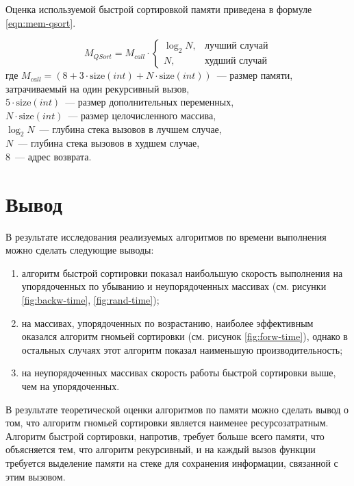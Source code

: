 Оценка используемой быстрой сортировкой памяти приведена в формуле \ref{eqn:mem-qsort}.

\begin{equation}
    \label{eqn:mem-qsort}
    M_{QSort} = M_{call} \cdot
    \begin{cases}
        \log_2{N}, & \text{лучший случай} \\
        N, & \text{худший случай}
    \end{cases}
\end{equation}
где  $M_{call} = (8 + 3 \cdot \text{size}(int) + N \cdot \text{size}(int))$~--- размер памяти, затрачиваемый на один рекурсивный вызов,
\\ $5 \cdot \text{size}(int)$~--- размер дополнительных переменных,
\\ $N \cdot \text{size}(int)$~--- размер целочисленного массива,
\\ $\log_2{N}$~--- глубина стека вызовов в лучшем случае,
\\ $N$~--- глубина стека вызовов в худшем случае,
\\ $8$~--- адрес возврата.

\section*{Вывод}

В результате исследования реализуемых алгоритмов по времени выполнения можно сделать следующие выводы:
\begin{enumerate}
    \item алгоритм быстрой сортировки показал наибольшую скорость выполнения на упорядоченных по убыванию и неупорядоченных массивах (см. рисунки \ref{fig:backw-time}, \ref{fig:rand-time});
    \item на массивах, упорядоченных по возрастанию, наиболее эффективным оказался алгоритм гномьей сортировки (см. рисунок \ref{fig:forw-time}), однако в остальных случаях этот алгоритм показал наименьшую производительность;
    \item на неупорядоченных массивах скорость работы быстрой сортировки выше, чем на упорядоченных.
\end{enumerate}

В результате теоретической оценки алгоритмов по памяти можно сделать вывод о том, что алгоритм гномьей сортировки является наименее ресурсозатратным.
Алгоритм быстрой сортировки, напротив, требует больше всего памяти, что объясняется тем, что алгоритм рекурсивный, и на каждый вызов функции требуется выделение памяти на стеке для сохранения информации, связанной с этим вызовом.